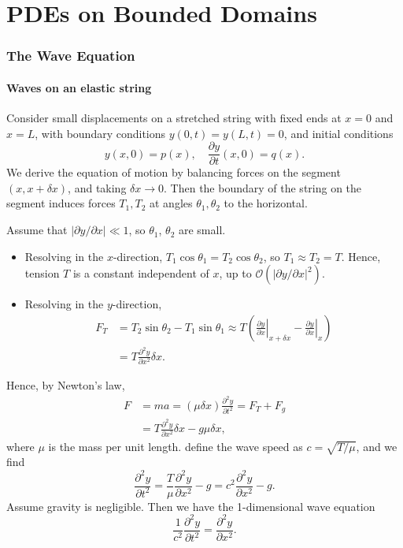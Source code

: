 \documentclass[12pt]{article}
\begin{document}
\newpage

\part{PDEs on Bounded Domains}%
\label{prt:pdes_on_bounded_domains}

\section{The Wave Equation}%
\label{sec:the_wave_equation}

\subsection{Waves on an elastic string}%
\label{sub:waves_on_an_elastic_string}

Consider small displacements on a stretched string with fixed ends at $x = 0$ and $x = L$, with boundary conditions $y(0, t) = y(L, t) = 0$, and initial conditions
\[
	y(x, 0) = p(x), \quad \frac{\partial y}{\partial t}(x, 0) = q(x)
.\]
We derive the equation of motion by balancing forces on the segment $(x, x + \delta x)$, and taking $\delta x \to 0$. Then the boundary of the string on the segment induces forces $T_1, T_2$ at angles $\theta_1, \theta_2$ to the horizontal.

Assume that $|\partial y/\partial x| \ll 1$, so $\theta_1$, $\theta_2$ are small.

\begin{itemize}
	\item Resolving in the $x$-direction, $T_1 \cos \theta_1 = T_2 \cos \theta_2$, so $T_1 \approx T_2 = T$. Hence, tension $T$ is a constant independent of $x$, up to $\mathcal{O}(|\partial y/\partial x|^2)$.
	\item Resolving in the $y$-direction,
		\begin{align*}
			F_T &= T_2 \sin \theta_2 - T_1 \sin \theta_1 \approx T \left( \left. \frac{\partial y}{\partial x}\right|_{x + \delta x} \!\!\!\!\!\! - \left. \frac{\partial y}{\partial x} \right|_{x}\right) \\
			    &= T \frac{\partial^2 y}{\partial x^2} \delta x.
		\end{align*}
\end{itemize}

Hence, by Newton's law,
\begin{align*}
	F &= ma = (\mu \delta x) \frac{\partial^2 y}{\partial t^2} = F_T + F_g \\
	&= T \frac{\partial^2 y}{\partial x^2} \delta x - g \mu \delta x,
\end{align*}
where $\mu$ is the mass per unit length. define the wave speed as $c = \sqrt{T/\mu}$, and we find
\[
\frac{\partial^2 y}{\partial t^2} = \frac{T}{\mu} \frac{\partial^2 y}{\partial x^2} - g = c^2 \frac{\partial^2 y}{\partial x^2} - g
.\] 
Assume gravity is negligible. Then we have the 1-dimensional wave equation
\[
\frac{1}{c^2} \frac{\partial^2 y}{\partial t^2} = \frac{\partial^2 y}{\partial x^2}
.\]
\end{document}
